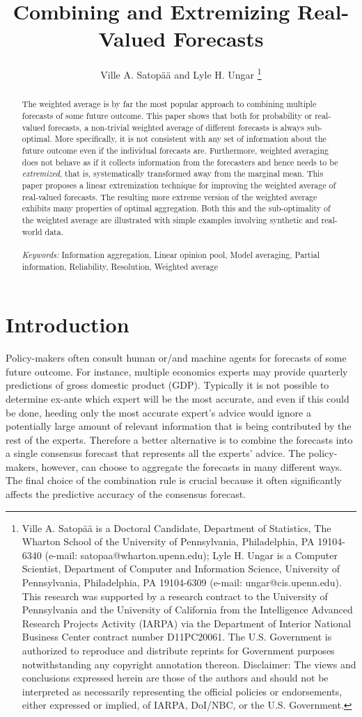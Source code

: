 \documentclass[11pt]{article}
\title{Combining and Extremizing Real-Valued Forecasts}
\author{
Ville A. Satop\"a\"a and Lyle H. Ungar \thanks{Ville A. Satop\"a\"a is a Doctoral Candidate, Department of Statistics, The Wharton School of the University of Pennsylvania, Philadelphia, PA 19104-6340 (e-mail: satopaa@wharton.upenn.edu); Lyle H. Ungar is a Computer Scientist, Department of Computer and Information Science, University of Pennsylvania, Philadelphia, PA 19104-6309 (e-mail: ungar@cis.upenn.edu). This research was supported by a research contract to the University
of Pennsylvania and the University of California from the Intelligence
Advanced Research Projects Activity (IARPA) via the Department of
Interior National Business Center contract number D11PC20061. The
U.S. Government is authorized to reproduce and distribute reprints for
Government purposes notwithstanding any copyright annotation
thereon. Disclaimer: The views and conclusions expressed herein are
those of the authors and should not be interpreted as necessarily
representing the official policies or endorsements, either expressed
or implied, of IARPA, DoI/NBC, or the U.S. Government.}}
\date{\vspace{-8.5ex}}
\theoremstyle{definition}
\theoremstyle{definition}
\begin{document}
\maketitle

\begin{abstract}

The weighted average is by far the most popular approach to combining
multiple forecasts of some future outcome. This paper shows that
both for probability or real-valued forecasts, a non-trivial weighted average
of different forecasts is always sub-optimal. More specifically, it is
not consistent with any set of information about the future outcome
even if the individual forecasts are. Furthermore, weighted averaging
does not behave as if it collects information from the forecasters and
hence needs to be \textit{extremized}, that is, 
systematically transformed away from the marginal mean. This paper
proposes a linear extremization technique for improving the weighted
average of real-valued forecasts. The resulting more extreme
version of the weighted average exhibits many properties of optimal
aggregation. Both this and the sub-optimality of the weighted average are illustrated with simple examples involving 
synthetic and real-world data. \\
\\
\textit{Keywords:} Information aggregation, Linear opinion pool, Model averaging, Partial information, Reliability, Resolution, Weighted average
\end{abstract}


\section{Introduction} \label{introduction}

Policy-makers often consult human or/and machine agents for forecasts
of some future outcome. For instance, multiple economics experts may
provide quarterly predictions of gross domestic product (GDP). Typically it is not possible to determine ex-ante which expert will be the most accurate, and even if this could be done, heeding only the most accurate expert's advice would ignore a potentially large amount of relevant information that is being contributed by the rest of the experts. Therefore a better alternative is to combine the
forecasts into a single consensus forecast that represents all the experts' advice. 
The policy-makers, however, can choose to aggregate the forecasts in many different ways. The final choice of the combination rule is crucial because it often
significantly affects the predictive accuracy of the consensus
forecast. 
\end{document}
